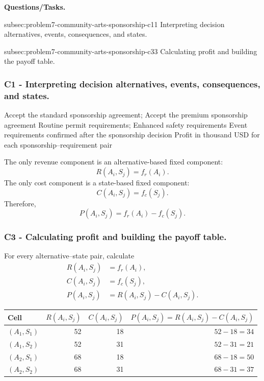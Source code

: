 \textbf{Questions/Tasks.}
\begin{enumerate}
	\CriterionTask
	{subsec:problem7-community-arts-sponsorship-c1}{1}
	{Interpreting decision alternatives, events, consequences, and states.}

	\CriterionTask
	{subsec:problem7-community-arts-sponsorship-c3}{3}
	{Calculating profit and building the payoff table.}
\end{enumerate}

\subsubsection*{C1 - Interpreting decision alternatives, events, consequences, and states.}
\label{subsec:problem7-community-arts-sponsorship-c1}

\DecisionElementsTable
{Accept the standard sponsorship agreement; Accept the premium sponsorship agreement}
{Routine permit requirements; Enhanced safety requirements}
{Event requirements confirmed after the sponsorship decision}
{Profit in thousand USD for each sponsorship--requirement pair}

The only revenue component is an alternative-based fixed component:
\[
R(A_i,S_j)=f_r(A_i).
\]
The only cost component is a state-based fixed component:
\[
C(A_i,S_j)=f_c(S_j).
\]
Therefore,
\[
P(A_i,S_j)
=
f_r(A_i)
-
f_c(S_j).
\]


\subsubsection*{C3 - Calculating profit and building the payoff table.}
\label{subsec:problem7-community-arts-sponsorship-c3}

For every alternative--state pair, calculate
\[
\begin{aligned}
	R(A_i,S_j)&=f_r(A_i),
	\\
	C(A_i,S_j)&=f_c(S_j),
	\\
	P(A_i,S_j)&=R(A_i,S_j)-C(A_i,S_j).
\end{aligned}
\]

\begin{center}
	\small
	\begin{tabular}{lrrr}
		\toprule
		Cell
		& \(R(A_i,S_j)\)
		& \(C(A_i,S_j)\)
		& \(P(A_i,S_j)=R(A_i,S_j)-C(A_i,S_j)\) \\
		\midrule
		\((A_1,S_1)\) & 52 & 18 & \(52-18=34\) \\
		\((A_1,S_2)\) & 52 & 31 & \(52-31=21\) \\
		\((A_2,S_1)\) & 68 & 18 & \(68-18=50\) \\
		\((A_2,S_2)\) & 68 & 31 & \(68-31=37\) \\
		\bottomrule
	\end{tabular}
\end{center}

